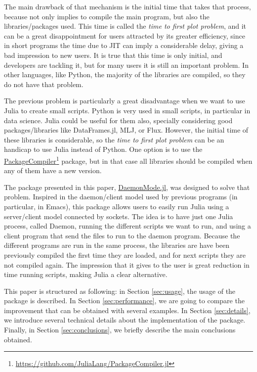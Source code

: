 \documentclass{juliacon}
\begin{document}
The main drawback of that mechanism is the initial time that takes that process,
because not only implies to compile the main program, but also the
libraries/packages used. This time is called the \textit{time to first plot problem},
and it can be a great disappointment for users attracted by its greater
efficiency, since in short programs the time due to JIT can imply a considerable
delay, giving a bad impression to new users. It is true that this time is only
initial, and developers are tackling it, but for many users it is still an important problem.
In other languages, like Python, the majority of the libraries are compiled, so
they do not have that problem.

The previous problem is particularly a great disadvantage when we want to use
Julia to create small scripts. Python is very used in small scripts, in
particular in data science. Julia could be useful for them also, specially
considering good packages/libraries like DataFrames.jl, MLJ, or Flux. However,
the initial time of these libraries is considerable, so the \textit{time to first plot
  problem} can be an handicap to use Julia instead of Python. One option is to
use the
\href{https://github.com/JuliaLang/PackageCompiler.jl}{PackageCompiler}\footnote{\url{https://github.com/JuliaLang/PackageCompiler.jl}}
package, but in that case all libraries should be compiled when any of them have
a new version.

The package presented in this paper,
\href{https://github.com/dmolina/DaemonMode.jl/}{DaemonMode.jl}, was designed to
solve that problem. Inspired in the daemon/client model used by previous
programs (in particular, in Emacs), this package allows users to easily run 
Julia using a server/client model connected by sockets. The idea is to have just
one Julia process, called Daemon, running the different scripts we want to run,
and using a client program that send the files to run to the daemon program.
Because the different programs are run in the same process, the libraries are
have been previously compiled the first time they are loaded, and for next scripts they are not
compiled again. The impression that it gives to the user is great reduction in time
running scripts, making Julia a clear alternative.

This paper is structured as following: in Section \ref{sec:usage}, the usage of
the package is described. In Section \ref{sec:performance}, we are going to
compare the improvement that can be obtained with several examples. In Section
\ref{sec:details}, we introduce several technical details about the
implementation of the package. Finally, in
Section \ref{sec:conclusions}, we briefly describe the main conclusions
obtained.
\end{document}

